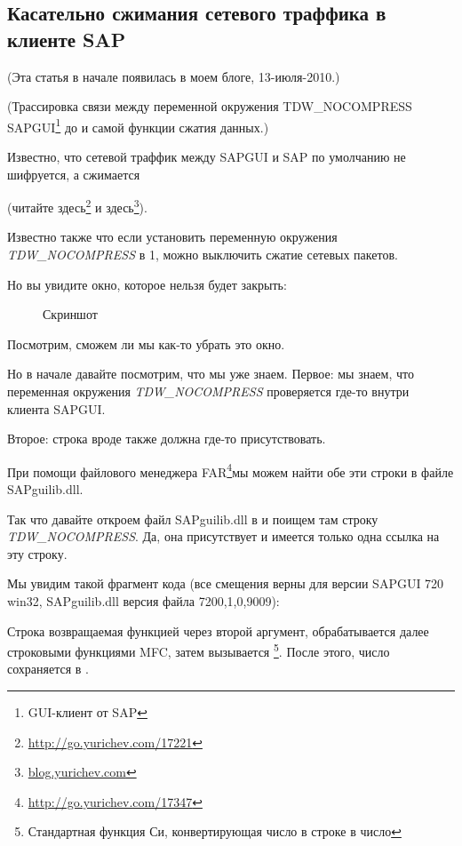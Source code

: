 \subsection{Касательно сжимания сетевого траффика в клиенте SAP}
\label{sec:SAPGUI}

(Эта статья в начале появилась в моем блоге, 13-июля-2010.)

\newcommand{\TDWNC}{TDW\_NOCOMPRESS\xspace}

(Трассировка связи между переменной окружения \TDWNC{} SAPGUI\footnote{GUI-клиент от SAP}
до  и самой функции сжатия данных.)

Известно, что сетевой траффик между SAPGUI и SAP по умолчанию не шифруется, а сжимается 

(читайте здесь\footnote{\url{http://go.yurichev.com/17221}} 
и здесь\footnote{\href{http://go.yurichev.com/17225}{blog.yurichev.com}}). 

Известно также что если установить переменную окружения \emph{\TDWNC} в 1, можно выключить сжатие сетевых пакетов.

Но вы увидите окно, которое нельзя будет закрыть:

\begin{figure}[H]
\centering
{}
\caption{Скриншот}
\end{figure}

Посмотрим, сможем ли мы как-то убрать это окно.

Но в начале давайте посмотрим, что мы уже знаем.
Первое: мы знаем, что переменная окружения \emph{\TDWNC} проверяется где-то внутри клиента SAPGUI.

Второе: строка вроде  также должна где-то присутствовать.

\newcommand{\FNURLFAR}{\footnote{\url{http://go.yurichev.com/17347}}}
При помощи файлового менеджера FAR\FNURLFAR мы можем найти обе эти строки в файле SAPguilib.dll.

Так что давайте откроем файл SAPguilib.dll в \IDA и поищем там строку \emph{\TDWNC}.
Да, она присутствует и имеется только одна ссылка на эту строку.

Мы увидим такой фрагмент кода
(все смещения верны для версии SAPGUI 720 win32, SAPguilib.dll версия файла 7200,1,0,9009):



Строка возвращаемая функцией  через второй аргумент, обрабатывается далее строковыми
функциями MFC, затем вызывается \footnote{Стандартная функция Си, конвертирующая число в строке в число}.
После этого, число сохраняется в .

